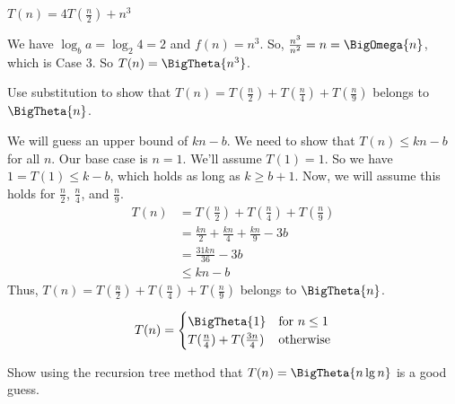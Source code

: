 \documentclass[12pt,letterpaper]{hmcpset}
\newcommand{\recur}[3]{T(n)=#1T(\frac{n}{#2})+#3}
\begin{document}
\begin{problem}[1f]
$\recur{4}{2}{n^3}$
\end{problem}

\begin{solution}
We have $\log_b a = \log_2 4 = 2$ and $f(n) = n^3$.  So, $\frac{n^3}{n^2} = n = \BigOmega{n}$, which is Case 3.  So $T(n) = \BigTheta{n^3}$.
\end{solution}

\begin{problem}[2]
Use substitution to show that $T(n) = T(\frac{n}{2}) + T(\frac{n}{4}) + T(\frac{n}{9})$ belongs to $\BigTheta{n}$.
\end{problem}

\begin{solution}
We will guess an upper bound of $kn - b$.  We need to show that $T(n) \leq kn-b$ for all $n$.  Our base case is $n=1$.  We'll assume $T(1) = 1$.  So we have $1 = T(1) \leq k - b$, which holds as long as $k \geq b + 1$.  Now, we will assume this holds for $\frac{n}{2}$, $\frac{n}{4}$, and $\frac{n}{9}$.
\begin{align*}
T(n) &= T(\frac{n}{2}) + T(\frac{n}{4}) + T(\frac{n}{9}) \\
{} &= \frac{kn}{2} + \frac{kn}{4} + \frac{kn}{9} -3b \\
{} &= \frac{31kn}{36} - 3b \\
{} &\leq kn - b
\end{align*}
Thus, $T(n) = T(\frac{n}{2}) + T(\frac{n}{4}) + T(\frac{n}{9})$ belongs to $\BigTheta{n}$.
\end{solution}

\begin{problem}[3]
\[
T(n) =
\begin{cases}
\BigTheta{1} &\mbox{for } n \leq 1\\
T(\frac{n}{4}) + T(\frac{3n}{4}) &\mbox{otherwise}
\end{cases}
\]
\end{problem}

\begin{problem}[3a]
Show using the recursion tree method that $T(n) = \BigTheta{n\lg n}$ is a good guess.
\end{problem}
\end{document}
